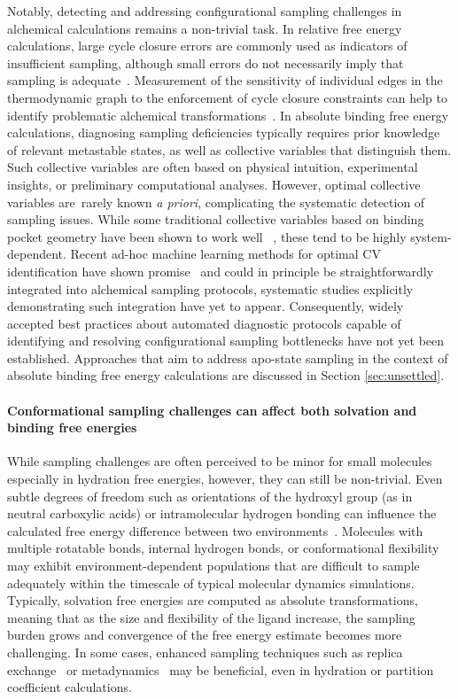 \documentclass[9pt,bestpractices]{livecoms}
\begin{document}
Notably, detecting and addressing configurational sampling challenges in alchemical calculations remains a non-trivial task. In relative free energy calculations, large cycle closure errors are commonly used as indicators of insufficient sampling, although small errors do not necessarily imply that sampling is adequate~\cite{suruzhon2021sensitivity}. Measurement of the sensitivity of individual edges in the thermodynamic graph to the enforcement of cycle closure constraints can help to identify problematic alchemical transformations~\cite{giese2025transferability}. In absolute binding free energy calculations, diagnosing sampling deficiencies typically requires prior knowledge of relevant metastable states, as well as collective variables that distinguish them. Such collective variables are often based on physical intuition, experimental insights, or preliminary computational analyses. However, optimal collective variables are rarely known \textit{a priori}, complicating the systematic detection of sampling issues. While some traditional collective variables based on binding pocket geometry have been shown to work well ~\cite{SchrodingerVogele}, these tend to be highly system-dependent. Recent ad-hoc machine learning methods for optimal CV identification have shown promise~\cite{gokdemir2025machine, sidky2020machine, bonati2021deep} and could in principle be straightforwardly integrated into alchemical sampling protocols, systematic studies explicitly demonstrating such integration have yet to appear. Consequently, widely accepted best practices about automated diagnostic protocols capable of identifying and resolving configurational sampling bottlenecks have not yet been established. Approaches that aim to address apo-state sampling in the context of absolute binding free energy calculations are discussed in Section \ref{sec:unsettled}.

\paragraph{Conformational sampling challenges can affect both solvation and binding free energies}
While sampling challenges are often perceived to be minor for small molecules especially in hydration free energies, however, they can still be non-trivial. Even subtle degrees of freedom such as orientations of the hydroxyl group (as in neutral carboxylic acids) or intramolecular hydrogen bonding can influence the calculated free energy difference between two environments~\cite{klimovich2010predicting, lim2019assessing}. Molecules with multiple rotatable bonds, internal hydrogen bonds, or conformational flexibility may exhibit environment-dependent populations that are difficult to sample adequately within the timescale of typical molecular dynamics simulations. Typically, solvation free energies are computed as absolute transformations, meaning that as the size and flexibility of the ligand increase, the sampling burden grows and convergence of the free energy estimate becomes more challenging. In some cases, enhanced sampling techniques such as replica exchange~\cite{rest2} or metadynamics~\cite{hsu2023alchemical, khuttan2024make} may be beneficial, even in hydration or partition coefficient calculations.
\end{document}
